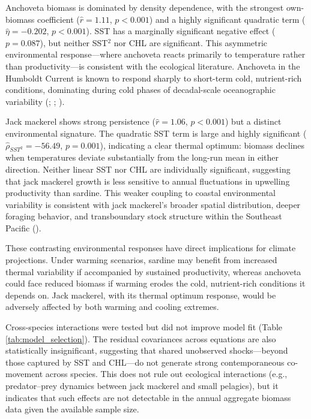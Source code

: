 \documentclass[
  11pt,
]{article}
\begin{document}
Anchoveta biomass is dominated by density dependence, with the strongest own-biomass coefficient (\(\hat{r} = 1.11\), \(p < 0.001\)) and a highly significant quadratic term (\(\hat{\eta} = -0.202\), \(p < 0.001\)). SST has a marginally significant negative effect (\(p = 0.087\)), but neither SST\(^2\) nor CHL are significant. This asymmetric environmental response---where anchoveta reacts primarily to temperature rather than productivity---is consistent with the ecological literature. Anchoveta in the Humboldt Current is known to respond sharply to short-term cold, nutrient-rich conditions, dominating during cold phases of decadal-scale oceanographic variability (; ; ).

Jack mackerel shows strong persistence (\(\hat{r} = 1.06\), \(p < 0.001\)) but a distinct environmental signature. The quadratic SST term is large and highly significant (\(\hat{\rho}_{SST^2} = -56.49\), \(p = 0.001\)), indicating a clear thermal optimum: biomass declines when temperatures deviate substantially from the long-run mean in either direction. Neither linear SST nor CHL are individually significant, suggesting that jack mackerel growth is less sensitive to annual fluctuations in upwelling productivity than sardine. This weaker coupling to coastal environmental variability is consistent with jack mackerel's broader spatial distribution, deeper foraging behavior, and transboundary stock structure within the Southeast Pacific ().

These contrasting environmental responses have direct implications for climate projections. Under warming scenarios, sardine may benefit from increased thermal variability if accompanied by sustained productivity, whereas anchoveta could face reduced biomass if warming erodes the cold, nutrient-rich conditions it depends on. Jack mackerel, with its thermal optimum response, would be adversely affected by both warming and cooling extremes.

Cross-species interactions were tested but did not improve model fit (Table \ref{tab:model_selection}). The residual covariances across equations are also statistically insignificant, suggesting that shared unobserved shocks---beyond those captured by SST and CHL---do not generate strong contemporaneous co-movement across species. This does not rule out ecological interactions (e.g., predator--prey dynamics between jack mackerel and small pelagics), but it indicates that such effects are not detectable in the annual aggregate biomass data given the available sample size.
\end{document}
